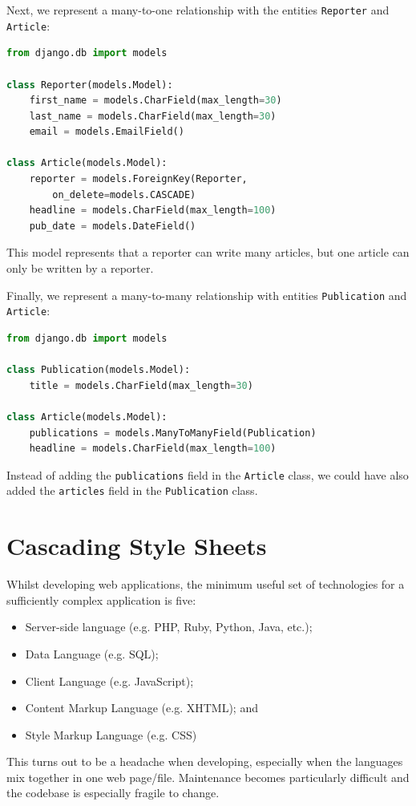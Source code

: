 \documentclass[a4paper, openany]{memoir}
\begin{document}
Next, we represent a many-to-one relationship with the entities \texttt{Reporter} and \texttt{Article}:
\begin{lstlisting}[language=python]
from django.db import models

class Reporter(models.Model):
    first_name = models.CharField(max_length=30)
    last_name = models.CharField(max_length=30)
    email = models.EmailField()
    
class Article(models.Model):
    reporter = models.ForeignKey(Reporter, 
        on_delete=models.CASCADE)
    headline = models.CharField(max_length=100)
    pub_date = models.DateField()
\end{lstlisting}
This model represents that a reporter can write many articles, but one article can only be written by a reporter.

Finally, we represent a many-to-many relationship with entities \texttt{Publication} and \texttt{Article}:
\begin{lstlisting}[language=python]
from django.db import models

class Publication(models.Model):
    title = models.CharField(max_length=30)

class Article(models.Model):
    publications = models.ManyToManyField(Publication)
    headline = models.CharField(max_length=100)
\end{lstlisting}
Instead of adding the \texttt{publications} field in the \texttt{Article} class, we could have also added the \texttt{articles} field in the \texttt{Publication} class.
\newpage

\section{Cascading Style Sheets}
Whilst developing web applications, the minimum useful set of technologies for a sufficiently complex application is five:
\begin{itemize}
    \item Server-side language (e.g. PHP, Ruby, Python, Java, etc.);
    \item Data Language (e.g. SQL);
    \item Client Language (e.g. JavaScript);
    \item Content Markup Language (e.g. XHTML); and
    \item Style Markup Language (e.g. CSS)
\end{itemize}
This turns out to be a headache when developing, especially when the languages mix together in one web page/file. Maintenance becomes particularly difficult and the codebase is especially fragile to change.
\end{document}
